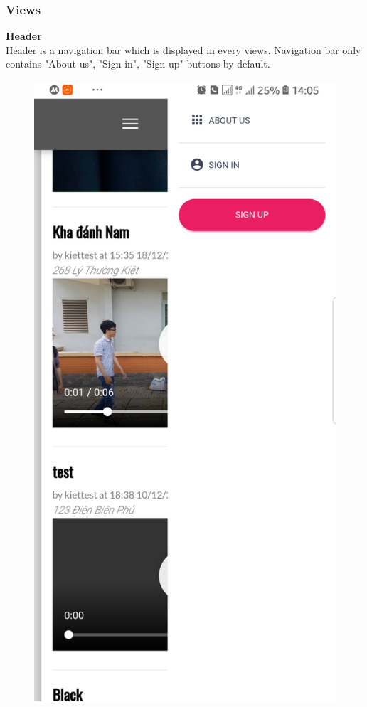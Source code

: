\subsubsection{Views}
	\textbf{Header}
\\
Header is a navigation bar which is displayed in every views. Navigation bar only contains "About us", "Sign in", "Sign up" buttons by default.
\begin{figure}[!htb]
  \includegraphics[width=\linewidth]{images/chap4/header_not_login_mb.jpg}

\end{figure}
